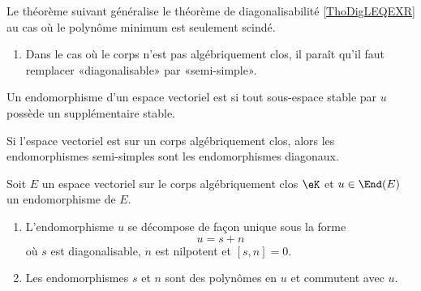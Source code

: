 Le théorème suivant généralise le théorème de diagonalisabilité \ref{ThoDigLEQEXR} au cas où le polynôme minimum est seulement scindé.

\begin{probleme}
    \begin{enumerate}
\item 
    Dans le cas où le corps n'est pas algébriquement clos, il paraît qu'il faut remplacer «diagonalisable» par «semi-simple».
    \end{enumerate}
\end{probleme}

\begin{definition}
    Un endomorphisme d'un espace vectoriel est  si tout sous-espace stable par \( u\) possède un supplémentaire stable.
\end{definition}
Si l'espace vectoriel est sur un corps algébriquement clos, alors les endomorphismes semi-simples sont les endomorphismes diagonaux.


\begin{theorem} \label{ThoRURcpW}
    Soit \( E\) un espace vectoriel sur le corps algébriquement clos \( \eK\) et \( u\in\End(E)\) un endomorphisme de \( E\). 
    
    \begin{enumerate}
        \item
            
            L'endomorphisme \( u\) se décompose de façon unique sous la forme
            \begin{equation}
                u=s+n
            \end{equation}
            où \( s\) est diagonalisable, \( n\) est nilpotent et \( [s,n]=0\).
        \item
            Les endomorphismes \( s\) et \( n\) sont des polynômes en \( u\) et commutent avec \( u\).
    \end{enumerate}
\end{theorem}

